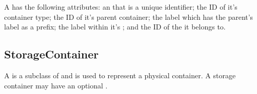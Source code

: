 A  has the following attributes: an
 that is a unique identifier; the ID of it's container
type; the ID of it's parent container; the label which has the parent's label
as a prefix; the label within it's ; and
the ID of the  it belongs to.

\subsection*{StorageContainer}
A  is a subclass of  and is
used to represent a physical container. A storage container may have an
optional .


